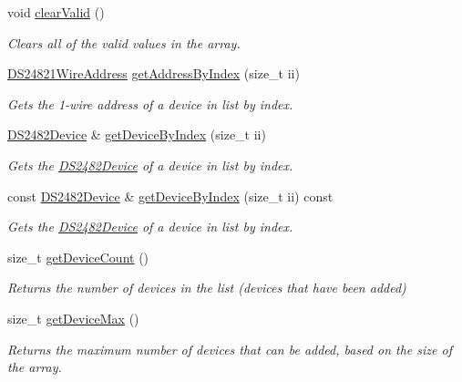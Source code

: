 \begin{DoxyCompactItemize}
void \mbox{\hyperlink{class_d_s2482_device_list_a2775548aa0394724d64a73f48b93f938}{clear\+Valid}} ()
\begin{DoxyCompactList}\small\item\em Clears all of the valid values in the array. \end{DoxyCompactList}\item 
\mbox{\hyperlink{class_d_s24821_wire_address}{D\+S24821\+Wire\+Address}} \mbox{\hyperlink{class_d_s2482_device_list_a6957f627e300638c9d25313664bc65e1}{get\+Address\+By\+Index}} (size\+\_\+t ii)
\begin{DoxyCompactList}\small\item\em Gets the 1-\/wire address of a device in list by index. \end{DoxyCompactList}\item 
\mbox{\hyperlink{class_d_s2482_device}{D\+S2482\+Device}} \& \mbox{\hyperlink{class_d_s2482_device_list_af135ad9891b100429037bb4101ae7ba6}{get\+Device\+By\+Index}} (size\+\_\+t ii)
\begin{DoxyCompactList}\small\item\em Gets the \mbox{\hyperlink{class_d_s2482_device}{D\+S2482\+Device}} of a device in list by index. \end{DoxyCompactList}\item 
const \mbox{\hyperlink{class_d_s2482_device}{D\+S2482\+Device}} \& \mbox{\hyperlink{class_d_s2482_device_list_a8063e2911399c2f957f05d9e41bad9fa}{get\+Device\+By\+Index}} (size\+\_\+t ii) const
\begin{DoxyCompactList}\small\item\em Gets the \mbox{\hyperlink{class_d_s2482_device}{D\+S2482\+Device}} of a device in list by index. \end{DoxyCompactList}\item 
size\+\_\+t \mbox{\hyperlink{class_d_s2482_device_list_aa7fdfbd1db3a6f22aff1135e7a566666}{get\+Device\+Count}} ()
\begin{DoxyCompactList}\small\item\em Returns the number of devices in the list (devices that have been added) \end{DoxyCompactList}\item 
size\+\_\+t \mbox{\hyperlink{class_d_s2482_device_list_a20680f2eeb04a5db9f0e82d8ceff872e}{get\+Device\+Max}} ()
\begin{DoxyCompactList}\small\item\em Returns the maximum number of devices that can be added, based on the size of the array. \end{DoxyCompactList}\end{DoxyCompactItemize}
